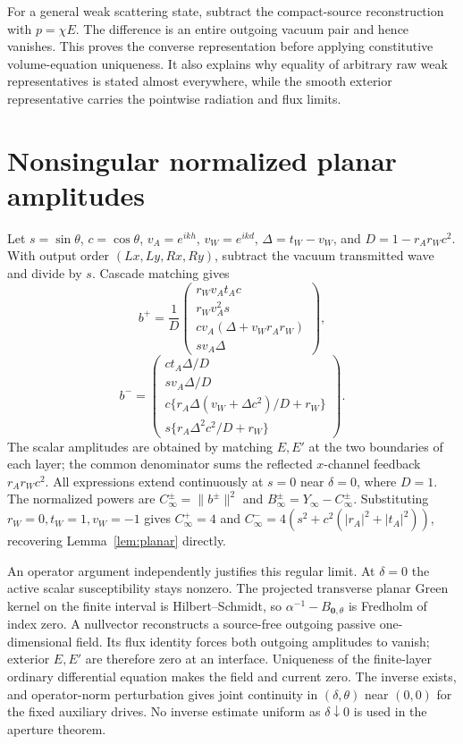\documentclass[11pt]{article}
\newcommand{\norm}[1]{\lVert #1\rVert}
\newcommand{\abs}[1]{\lvert #1\rvert}
\begin{document}
For a general weak scattering state, subtract the compact-source reconstruction with $p=\chi E$. The difference is an entire outgoing vacuum pair and hence vanishes. This proves the converse representation before applying constitutive volume-equation uniqueness. It also explains why equality of arbitrary raw weak representatives is stated almost everywhere, while the smooth exterior representative carries the pointwise radiation and flux limits.

\section{Nonsingular normalized planar amplitudes}\label{app:amplitudes}
Let $s=\sin\theta$, $c=\cos\theta$, $v_A=e^{ikh}$, $v_W=e^{ikd}$, $\Delta=t_W-v_W$, and $D=1-r_Ar_Wc^2$. With output order $(Lx,Ly,Rx,Ry)$, subtract the vacuum transmitted wave and divide by $s$. Cascade matching gives
\begin{equation}\label{eq:amplitudes-plus}
 b^+=\frac1D\begin{pmatrix}
 r_Wv_At_Ac\\r_Wv_A^2s\\cv_A(\Delta+v_Wr_Ar_W)\\sv_A\Delta
 \end{pmatrix},
\end{equation}
\begin{equation}\label{eq:amplitudes-minus}
 b^-=\begin{pmatrix}
 ct_A\Delta/D\\sv_A\Delta/D\\
 c\{r_A\Delta(v_W+\Delta c^2)/D+r_W\}\\
 s\{r_A\Delta^2c^2/D+r_W\}
 \end{pmatrix}.
\end{equation}
The scalar amplitudes are obtained by matching $E,E'$ at the two boundaries of each layer; the common denominator sums the reflected $x$-channel feedback $r_Ar_Wc^2$. All expressions extend continuously at $s=0$ near $\delta=0$, where $D=1$. The normalized powers are $C_\infty^\pm=\norm{b^\pm}^2$ and $B_\infty^\pm=Y_\infty-C_\infty^\pm$. Substituting $r_W=0,t_W=1,v_W=-1$ gives $C_\infty^+=4$ and $C_\infty^-=4(s^2+c^2(\abs{r_A}^2+\abs{t_A}^2))$, recovering Lemma~\ref{lem:planar} directly.

An operator argument independently justifies this regular limit. At $\delta=0$ the active scalar susceptibility stays nonzero. The projected transverse planar Green kernel on the finite interval is Hilbert--Schmidt, so $\alpha^{-1}-B_{\mathbf0,\theta}$ is Fredholm of index zero. A nullvector reconstructs a source-free outgoing passive one-dimensional field. Its flux identity forces both outgoing amplitudes to vanish; exterior $E,E'$ are therefore zero at an interface. Uniqueness of the finite-layer ordinary differential equation makes the field and current zero. The inverse exists, and operator-norm perturbation gives joint continuity in $(\delta,\theta)$ near $(0,0)$ for the fixed auxiliary drives. No inverse estimate uniform as $\delta\downarrow0$ is used in the aperture theorem.



\end{document}
